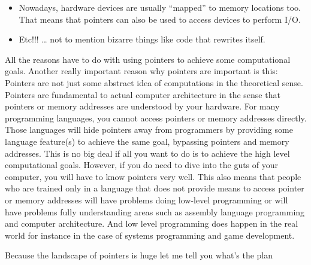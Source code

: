 \begin{itemize}
\item
  Nowadays, hardware devices are usually ``mapped'' to memory locations
  too. That means that pointers can also be used to access devices to
  perform I/O.
\item
  Etc!!! \ldots{} not to mention bizarre things like code that rewrites
  itself.
\end{itemize}

All the reasons have to do with using pointers to achieve some computational goals. Another really important reason why pointers are important is this: Pointers are not just some abstract idea of computations in the theoretical sense. Pointers are fundamental to actual computer architecture in the sense that pointers or memory addresses are understood by your hardware. For many programming languages, you cannot access pointers or memory addresses directly. Those languages will hide pointers away from programmers by providing some language feature(s) to achieve the same goal, bypassing pointers and memory addresses. This is no big deal if all you want to do is to achieve the high level computational goals. However, if you do need to dive into the guts of your computer, you will have to know pointers very well. This also means that people who are trained only in a language that does not provide means to access pointer or memory addresses will have problems doing low-level programming or will have problems fully understanding areas such as assembly language programming and computer architecture. And low level programming does happen in the real world for instance in the case of systems programming and game development.

Because the landscape of pointers is huge let me tell you what's the plan

